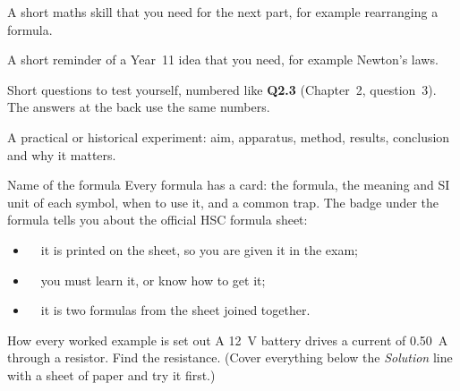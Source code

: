 \begin{sidebyside}[0.5]
  \begin{toolkit}[before skip=0pt, after skip=0pt, equal height group=legend3]{}
    A short maths skill that you need for the next part, for example
    rearranging a formula.
  \end{toolkit}
\nextside
  \begin{refresher}[before skip=0pt, after skip=0pt, equal height group=legend3]{}
    A short reminder of a Year~11 idea that you need, for example Newton's
    laws.
  \end{refresher}
\end{sidebyside}

\begin{sidebyside}[0.5]
  \begin{tcolorbox}[hsc minor=hscqc, unbreakable, before skip=0pt, after skip=0pt,
      equal height group=legend4, title={\hscboxtitle{\faQuestionCircle}{Quick check}{}}]
    Short questions to test yourself, numbered like \textcolor{hscqc}{\bfseries Q2.3}
    (Chapter~2, question~3). The answers at the back use the same numbers.
  \end{tcolorbox}
\nextside
  \begin{experiment}[unbreakable, before skip=0pt, after skip=0pt, equal height group=legend4]{}
    A practical or historical experiment: aim, apparatus, method, results,
    conclusion and why it matters.
  \end{experiment}
\end{sidebyside}

\begin{formulacard}[unbreakable, before skip=6pt]{Name of the formula}
  Every formula has a card: the formula, the meaning and SI unit of each
  symbol, when to use it, and a common trap. The badge under the formula tells
  you about the official HSC formula sheet:
  \begin{itemize}
    \item \hscbadgeonsheet\ \ it is printed on the sheet, so you are given it
          in the exam;
    \item \hscbadgenotonsheet\ \ you must learn it, or know how to get it;
    \item {}\ \ it is two formulas from the sheet
          joined together.
  \end{itemize}
\end{formulacard}

\begin{workedexample}{How every worked example is set out}
  A \qty{12}{V} battery drives a current of \qty{0.50}{A} through a resistor.
  Find the resistance. (Cover everything below the \emph{Solution} line with a
  sheet of paper and try it first.)
\end{workedexample}

